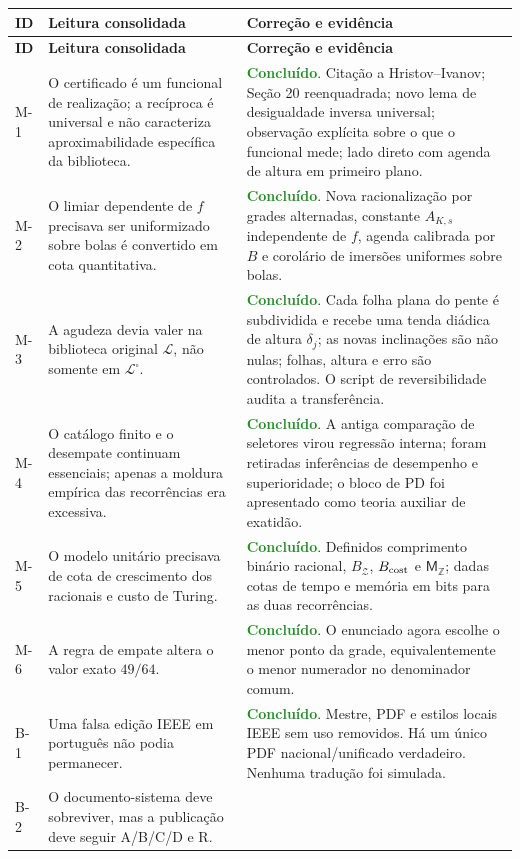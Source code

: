 \documentclass[11pt,a4paper]{article}
\newcommand{\feito}{\textcolor{ForestGreen}{\textbf{Concluído}}}
\newcommand{\Library}{\mathcal L}
\newcommand{\LibraryMarked}{\mathcal L^{\square}}
\begin{document}
\small
\begin{longtable}{L{0.07\textwidth}L{0.36\textwidth}L{0.45\textwidth}}
\toprule
\textbf{ID} & \textbf{Leitura consolidada} & \textbf{Correção e evidência}\\
\midrule
\endfirsthead
\toprule
\textbf{ID} & \textbf{Leitura consolidada} & \textbf{Correção e evidência}\\
\midrule
\endhead
M-1 & O certificado é um funcional de realização; a recíproca é universal e não
caracteriza aproximabilidade específica da biblioteca. & \feito. Citação a
Hristov--Ivanov; Seção 20 reenquadrada; novo lema de desigualdade inversa universal;
observação explícita sobre o que o funcional mede; lado direto com agenda de altura em
primeiro plano.\\
M-2 & O limiar dependente de $f$ precisava ser uniformizado sobre bolas é convertido em
cota quantitativa. & \feito. Nova racionalização por grades alternadas, constante
$A_{K,s}$ independente de $f$, agenda calibrada por $B$ e corolário de imersões
uniformes sobre bolas.\\
M-3 & A agudeza devia valer na biblioteca original $\Library$, não somente em
$\LibraryMarked$. & \feito. Cada folha plana do pente é subdividida e recebe uma tenda
diádica de altura $\delta_j$; as novas inclinações são não nulas; folhas, altura e erro
são controlados. O script de reversibilidade audita a transferência.\\
M-4 & O catálogo finito e o desempate continuam essenciais; apenas a moldura empírica
das recorrências era excessiva. & \feito. A antiga comparação de seletores virou
regressão interna; foram retiradas inferências de desempenho e superioridade; o bloco de
PD foi apresentado como teoria auxiliar de exatidão.\\
M-5 & O modelo unitário precisava de cota de crescimento dos racionais e custo de
Turing. & \feito. Definidos comprimento binário racional, $B_{\mathcal Z}$,
$B_{\rm cost}$ e $\mathsf M_{\mathbb Z}$; dadas cotas de tempo e memória em bits para as
duas recorrências.\\
M-6 & A regra de empate altera o valor exato $49/64$. & \feito. O enunciado agora escolhe
o menor ponto da grade, equivalentemente o menor numerador no denominador comum.\\
B-1 & Uma falsa edição IEEE em português não podia permanecer. & \feito. Mestre, PDF e
estilos locais IEEE sem uso removidos. Há um único PDF nacional/unificado verdadeiro. Nenhuma tradução
foi simulada.\\
B-2 & O documento-sistema deve sobreviver, mas a publicação deve seguir A/B/C/D e R. &

\end{longtable}
\end{document}
